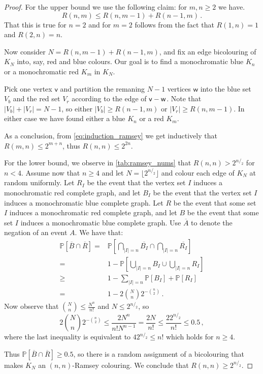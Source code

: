\documentclass[12pt]{amsart}
\theoremstyle{definition}
\newcommand{\PP}{\mathbb{P}}
\newcommand{\vv}{\mathsf{v}}
\newcommand{\vw}{\mathsf{w}}
\begin{document}
\begin{proof}
For the upper bound we use the following claim: for $m, n \geq 2$ we have.
\begin{equation}\label{eq:induction_ramsey}
R(n, m) \leq R(n, m- 1) + R(n-1, m) \, .
\end{equation}
That this is true for $n = 2$ and for $m = 2$ follows from the fact that $R(1, n) = 1$ and $R(2, n) = n$.

Now consider $N = R(n, m- 1) + R(n-1, m)$, and fix an edge bicolouring of $K_N$ into, say, red and blue colours.
Our goal is to find a monochromatic blue $K_n $ or a monochromatic red $K_m$ in $K_N$.

Pick one vertex $\vv$ and partition the remaning $N-1$ vertices $\vw$ into the blue set $V_b$ and the red set $V_r$ according to the edge of $\vv \-- \vw$.
Note that $|V_b| + |V_r| = N-1$, so either $|V_b| \geq  R(n-1, m)$ or $|V_r| \geq  R(n, m- 1)$.
In either case we have found either a blue $K_n$ or a red $K_m$.

As a conclusion, from \eqref{eq:induction_ramsey} we get inductively that $R(m, n) \leq 2^{m+n}$, thus $R(n, n) \leq 2^{2n}$.


For the lower bound, we observe in \cref{tab:ramsey_nums} that $R(n, n) > 2^{n/_2}$ for $n < 4$. 
Assume now that $n\geq 4$ and let $N = \lfloor 2^{n/_2} \rfloor $ and colour each edge of $K_N$ at random uniformly.
Let $R_I$ be the event that the vertex set $I$ induces a monochromatic red complete graph, and let $B_I$ be the event that the vertex set $I$ induces a monochromatic blue complete graph.
Let $R$ be the event that some set $I$ induces a monochromatic red complete graph, and let $B$ be the event that some set $I$ induces a monochromatic blue complete graph.
Use $\overline{A}$ to denote the negation of an event $A$.
We have that:
\begin{align*}
\PP[\overline{B} \cap \overline{R}] =& \PP[\bigcap_{|I| = n} \overline{B_I} \cap \bigcap_{|I| = n} \overline{R_I}]\\
=& 1 - \PP[\bigcup_{|I| = n} B_I \cup \bigcup_{|I| = n} R_I]\\
\geq & 1 - \sum_{|I| = n} \PP[B_I] + \PP[R_I]\\
=& 1 - 2\binom{N}{n} 2^{-\binom{n}{2}}\, .
\end{align*}
Now observe that $\binom{N}{n} \leq\frac{N^n}{n!}$ and $N \leq 2^{n/_2}$, so
$$2\binom{N}{n} 2^{-\binom{n}{2}} \leq \frac{2 N^n}{n! N^{n-1}} = \frac{2N}{n!} \leq \frac{ 2 2^{n/_2}}{n!} \leq 0.5 \, ,$$
where the last inequality is equivalent to $4 2^{n/_2} \leq n!$ which  holds for $n \geq 4$.

Thus $\PP[\overline{B} \cap \overline{R}]  \geq 0.5$, so there is a random assignment of a bicolouring that makes $K_N$ an $(n, n)$-Ramsey colouring.
We conclude that $R(n, n) \geq 2^{n/_2}$.
\end{proof}
\end{document}
